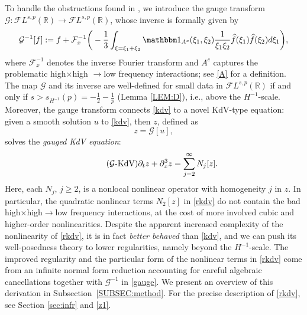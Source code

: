\documentclass[%
11pt,  reqno]{amsart}
\newcommand{\5}{\textup{V}}
\newcommand{\FL}{\mathcal{F} L}
\newcommand{\ft}{\widehat}
\newcommand{\ind}{\mathbbm 1}
\theoremstyle{remark}
\newcommand{\R}{\mathbb{R}}
\newcommand{\Ft}{{\mathcal{F}}}
\newcommand{\Gc}{\mathcal{G}}
\numberwithin{equation}{section}
\numberwithin{theorem}{section}
\begin{document}
To handle the obstructions found in \cite{Grunrock_ldv_hier}, we introduce the gauge transform $\Gc:\FL^{s,p}(\R) \to \FL^{s,p}(\R)$, whose inverse is formally given by 
    \begin{equation}
\label{gauge}
\Gc^{-1}[f] 
:= f + \Ft_x^{-1}\bigg( - \frac{1}{3} \int_{\xi=\xi_1+\xi_2} \ind_{A^c}(\xi_1,\xi_2) \frac{1}{\xi_1\xi_2} \ft{f}(\xi_1) \ft{f}(\xi_2) d\xi_1 \bigg), 
    \end{equation}
    where $\Ft^{-1}_x$ denotes the inverse Fourier transform and 
$A^c$ captures the problematic high$\times$high $\to$low frequency interactions; see \eqref{A} for a definition. 
The map $\Gc$ and its inverse are well-defined for small data in $\FL^{s,p}(\R)$ if and only if $s>s_{H^{-1}}(p)=-\frac12-\frac1p$ (Lemma \ref{LEM:D}), i.e., above the $H^{-1}$-scale. 
    Moreover,
the gauge transform connects \eqref{kdv} to a novel KdV-type equation: given a smooth solution $u$ to \eqref{kdv}, then $z$, defined as 
    \begin{equation}\label{defi_z_intro}
z=\mathcal{G}[u],
    \end{equation}
solves the \emph{gauged KdV equation}:
\begin{equation}
\label{rkdv}\tag{$\Gc$-KdV}
\partial_t z+ \partial_x^3 z = 
\sum_{j=2}^\infty 
N_j[z].
	\end{equation}
Here, 
each $N_j$, $j\ge 2$, is a nonlocal nonlinear operator with homogeneity $j$ in $z$. In particular, the quadratic nonlinear terms $N_2[z]$ in \eqref{rkdv} do not contain the bad high$\times$high$\to$low frequency interactions, at the cost of more involved cubic and higher-order nonlinearities. 
  Despite the apparent increased complexity of the nonlinearity of \eqref{rkdv}, it is in fact \emph{better behaved} than \eqref{kdv}, and we can push its well-posedness theory to lower regularities, namely beyond the $H^{-1}$-scale.
The improved regularity and the particular form of the nonlinear terms in \eqref{rkdv} come from an infinite normal form reduction
accounting for careful algebraic cancellations together with $\Gc^{-1}$ in \eqref{gauge}.
We present an overview of this derivation in Subsection~\ref{SUBSEC:method}. For the precise description of \eqref{rkdv}, see Section \ref{sec:infr} and \eqref{z1}.



\medskip 
    
\end{document}
